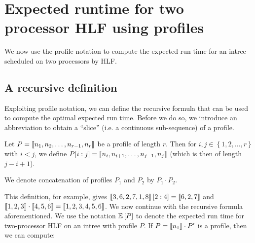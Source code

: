 \section{Expected runtime for two processor HLF using profiles}
\label{sec:p2-profiles-hlf-exp-runtime}

We now use the profile notation to compute the expected run time for an intree scheduled on two processors by HLF.

\subsection{A recursive definition}
\label{sec:p2-profile-exp-run-time-rec-def}

Exploiting profile notation, we can define the recursive formula that can be used to compute the optimal expected run time. Before we do so, we introduce an abbreviation to obtain a ``slice'' (i.e. a continuous sub-sequence) of a profile.

\newcommand{\profileconcat}{\cdot}
\begin{definition}
  Let $P=\left\llbracket n_1,n_2,\dots,n_{r-1},n_r \right\rrbracket$ be a profile of length $r$. Then for $i,j\in\left\{ 1,2,\dots,r \right\}$ with $i<j$, we define $P[i:j]=\left\llbracket n_i,n_{i+1},\dots,n_{j-1},n_j \right\rrbracket$ (which is then of length $j-i+1$).

  We denote concatenation of profiles $P_1$ and $P_2$ by $P_1 \profileconcat P_2$.
\end{definition}

This definition, for example, gives $\left\llbracket 3,6,2,7,1,8 \right\rrbracket[2:4] = \left\llbracket 6,2,7 \right\rrbracket$ and $\profile{1,2,3}\profileconcat\profile{4,5,6}=\profile{1,2,3,4,5,6}$.
We now continue with the recursive formula aforementioned. We use the notation $\mathbb{E}\left[ P \right]$ to denote the expected run time for two-processor HLF on an intree with profile $P$. If $P=\profile{n_1}\profileconcat P'$ is a profile, then we can compute:

